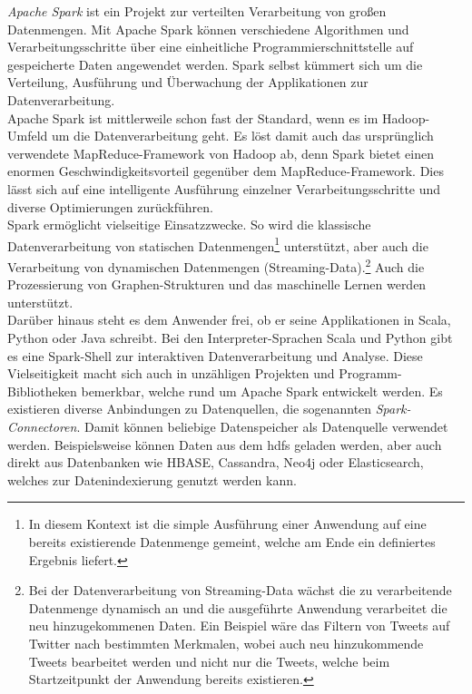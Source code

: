 \textit{Apache Spark\texttrademark\thinspace} ist ein Projekt zur verteilten Verarbeitung von großen Datenmengen. Mit Apache Spark können verschiedene Algorithmen und Verarbeitungsschritte über eine einheitliche Programmierschnittstelle auf gespeicherte Daten  angewendet werden. Spark selbst kümmert sich um die Verteilung, Ausführung und Überwachung der Applikationen zur Datenverarbeitung.\cite[S. 2]{learning_spark}\\
Apache Spark ist mittlerweile schon fast der Standard, wenn es im Hadoop-Umfeld um die Datenverarbeitung geht. Es löst damit auch das ursprünglich verwendete MapReduce-Framework von Hadoop ab, denn Spark
bietet einen enormen Geschwindigkeitsvorteil gegenüber dem MapReduce-Framework. Dies lässt sich auf eine intelligente Ausführung einzelner Verarbeitungsschritte und diverse Optimierungen zurückführen.\cite[S. 148 ff.]{expert_hadoop_admin}\\

\noindent
Spark ermöglicht vielseitige Einsatzzwecke. So wird die klassische Datenverarbeitung von statischen Datenmengen\footnote{In diesem Kontext ist die simple Ausführung einer Anwendung auf eine bereits existierende Datenmenge gemeint, welche am Ende ein definiertes Ergebnis liefert.} unterstützt, aber auch die Verarbeitung von dynamischen Datenmengen (Streaming-Data).\footnote{Bei der Datenverarbeitung von Streaming-Data wächst die zu verarbeitende Datenmenge dynamisch an und die ausgeführte Anwendung verarbeitet die neu hinzugekommenen Daten. Ein Beispiel wäre das Filtern von Tweets auf Twitter nach bestimmten Merkmalen, wobei auch neu hinzukommende Tweets bearbeitet werden und nicht nur die Tweets, welche beim Startzeitpunkt der Anwendung bereits existieren.} Auch die Prozessierung von Graphen-Strukturen und das maschinelle Lernen werden unterstützt.\cite[S. 152]{expert_hadoop_admin}\\

\noindent
Darüber hinaus steht es dem Anwender frei, ob er seine Applikationen in Scala, Python oder Java schreibt. Bei den Interpreter-Sprachen Scala und Python gibt es eine Spark-Shell zur interaktiven Datenverarbeitung und Analyse. Diese Vielseitigkeit macht sich auch in unzähligen Projekten und Programm-Bibliotheken bemerkbar, welche rund um Apache Spark entwickelt werden.
Es existieren diverse Anbindungen zu Datenquellen, die sogenannten \textit{Spark-Connectoren}. Damit können beliebige Datenspeicher als Datenquelle verwendet werden.
Beispielsweise können Daten aus dem \gls{hdfs} geladen werden, aber auch direkt aus Datenbanken wie HBASE, Cassandra, Neo4j oder Elasticsearch, welches zur Datenindexierung genutzt werden kann.  \\

